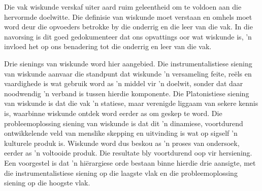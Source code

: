 Die vak wiskunde verskaf uiter aard ruim geleentheid om te voldoen aan
die hervormde doelwitte.
Die definisie van wiskunde moet verstaan ​​en omhels moet word deur die
opvoeders betrokke by die onderrig en die leer van die vak.
In die navorsing is dit goed gedokumenteer dat ons opvattings oor wat
wiskunde is, 'n invloed het op ons benadering tot die onderrig en leer
van die vak.

Drie sienings van wiskunde word hier aangebied.
Die instrumentalistiese siening van wiskunde aanvaar die standpunt dat
wiskunde 'n versameling feite, re\"{e}ls en vaardighede is wat gebruik
word as 'n middel vir 'n doelwit, sonder dat daar noodwendig 'n
verband is tussen hierdie komponente.
Die Platonistiese siening van wiskunde is dat die vak 'n statiese,
maar verenigde liggaam van sekere kennis is, waarbinne wiskunde ontdek
word eerder as om geskep te word.
Die probleemoplossing siening van wiskunde is dat dit 'n dinamiese,
voortdurend ontwikkelende veld van menslike skepping en uitvinding is
wat op sigself 'n kulturele produk is.
Wiskunde word dus beskou as 'n proses van ondersoek, eerder as 'n
voltooide produk.
Die resultate bly voortdurend oop vir hersiening.
Een voorgestel is dat 'n hi\"{e}rargiese orde bestaan ​​binne hierdie
drie aansigte, met die instrumentalistiese siening op die laagste vlak
en die probleemoplossing siening op die hoogste vlak.

